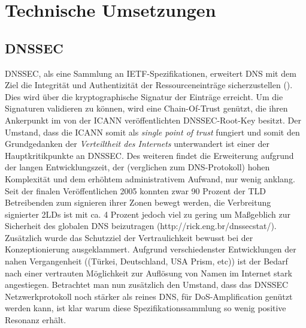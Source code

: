 \chapter{Technische Umsetzungen}
\label{chap:technologies}

\section{DNSSEC}

DNSSEC, als eine Sammlung an IETF-Spezifikationen, erweitert DNS mit dem Ziel die Integrität und Authentizität der Ressourceneinträge sicherzustellen (\cite{Arends2005}). Dies wird über die kryptographische Signatur der Einträge erreicht. Um die Signaturen validieren zu können, wird eine Chain-Of-Trust genützt, die ihren Ankerpunkt im von der ICANN veröffentlichten DNSSEC-Root-Key besitzt. Der Umstand, dass die ICANN somit als \textit{single point of trust} fungiert und somit den Grundgedanken der \textit{Verteiltheit des Internets} unterwandert ist einer der Hauptkritikpunkte an DNSSEC. Des weiteren findet die Erweiterung aufgrund der langen Entwicklungszeit, der (verglichen zum DNS-Protokoll) hohen Komplexität und dem erhöhtem administrativem Aufwand, nur wenig anklang. Seit der finalen Veröffentlichen 2005 konnten zwar 90 Prozent der TLD Betreibenden zum signieren ihrer Zonen bewegt werden, die Verbreitung signierter 2LDs ist mit ca. 4 Prozent jedoch viel zu gering um Maßgeblich zur Sicherheit des globalen DNS beizutragen (http://rick.eng.br/dnssecstat/). Zusätzlich wurde das Schutzziel der Vertraulichkeit bewusst bei der Konzeptionierung ausgeklammert. Aufgrund verschiedenster Entwicklungen der nahen Vergangenheit ((Türkei, Deutschland, USA Prism, etc)) ist der Bedarf nach einer vertrauten Möglichkeit zur Auflösung von Namen im Internet stark angestiegen. Betrachtet man nun zusätzlich den Umstand, dass das DNSSEC Netzwerkprotokoll noch stärker als reines DNS, für DoS-Amplification genützt werden kann, ist klar warum diese Spezifikationssammlung so wenig positive Resonanz erhält.



